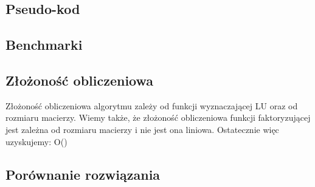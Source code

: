 \documentclass{article}
\begin{document}
\subsection{Pseudo-kod}
\subsection{Benchmarki}
\subsection{Złożoność obliczeniowa}
\qquad Złożoność obliczeniowa algorytmu zależy od funkcji wyznaczającej LU oraz od rozmiaru macierzy. Wiemy także, że złożoność obliczeniowa funkcji faktoryzującej jest zależna od rozmiaru macierzy i nie jest ona liniowa. Ostatecznie więc uzyskujemy: O() 
\subsection{Porównanie rozwiązania}
\end{document}
